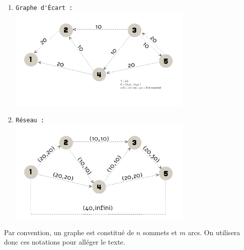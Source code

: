 \documentclass[11pt, a4paper]{report}
\begin{document}
\begin{enumerate}
	\pagebreak
		\item \verb|Graphe d'Écart :|\\
	\includegraphics[width=0.7\textwidth]{images/GE4.png}\\
		\item \verb|Réseau :|\\
	\includegraphics[width=0.7\textwidth]{images/R2.png}\\
	\end{enumerate}
	
	Par convention, un graphe est constitué de $n$ sommets et $m$ arcs. On utilisera donc ces notations pour alléger le texte.
	
\end{document}
